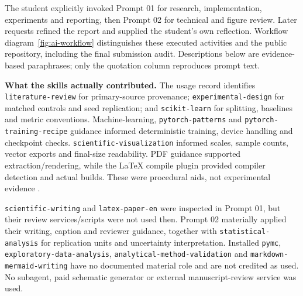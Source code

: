 \documentclass[10pt,a4paper]{article}
\begin{document}
The student explicitly invoked Prompt 01 for research, implementation,
experiments and reporting, then Prompt 02 for technical and figure review.
Later requests refined the report and supplied the student's own reflection.
Workflow diagram~\ref{fig:ai-workflow} distinguishes these executed activities
and the public repository, including the final submission audit. Descriptions below
are evidence-based paraphrases; only the quotation column reproduces prompt text.


\textbf{What the skills actually contributed.}
The usage record identifies \texttt{literature-review} for primary-source
provenance; \texttt{experimental-design} for matched controls and seed replication;
and \texttt{scikit-learn} for splitting, baselines and metric conventions.
Machine-learning, \texttt{pytorch-patterns} and \texttt{pytorch-training-recipe}
guidance informed deterministic training, device handling and checkpoint checks.
\texttt{scientific-visualization} informed scales, sample counts, vector exports
and final-size readability. PDF guidance supported extraction/rendering, while
the LaTeX compile plugin provided compiler detection and actual builds.
These were procedural aids, not experimental evidence \cite{skills}.

\texttt{scientific-writing} and \texttt{latex-paper-en} were inspected in
Prompt 01, but their review services/scripts were not used then. Prompt 02
materially applied their writing, caption and reviewer guidance, together with
\texttt{statistical-analysis} for replication units and uncertainty interpretation.
Installed \texttt{pymc}, \texttt{exploratory-data-analysis},
\texttt{analytical-method-validation} and \texttt{markdown-mermaid-writing} have
no documented material role and are not credited as used. No subagent,
paid schematic generator or external manuscript-review service was used.
\clearpage
\end{document}
